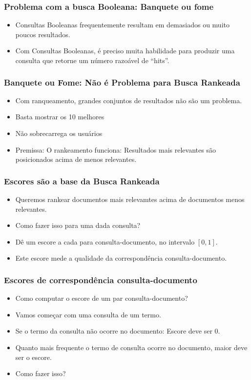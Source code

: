 \documentclass[compress]{beamer}
\def\myblue#1{\textcolor{texblue}{#1}}
\begin{document}
\begin{frame}[<+->]
\frametitle{Problema com a busca Booleana: Banquete ou fome}
\pause[2]
\begin{itemize}
\item Consultas Booleanas frequentemente resultam em demasiados ou muito poucos resultados.
\item Com Consultas Booleanas, é preciso muita habilidade para produzir uma consulta que retorne um número razoável de ``hits''.
\end{itemize}
\end{frame}

\begin{frame}[<+->]
\frametitle{Banquete ou Fome: Não é Problema para Busca Rankeada}
\pause[2]
\begin{itemize}
\item Com ranqueamento, grandes conjuntos de resultados não são um problema.
\item Basta mostrar os 10 melhores
\item Não sobrecarrega os usuários
\item Premissa: O rankeamento funciona: \myblue{Resultados mais relevantes são posicionados acima de menos relevantes.}
\end{itemize}
\end{frame}

\begin{frame}[<+->]
\frametitle{Escores são a base da Busca Rankeada}
\pause[2]
\begin{itemize}
\item Queremos rankear documentos mais relevamtes acima de documentos menos relevantes.
\item Como fazer isso para uma dada consulta?
\item Dê um escore a cada para consulta-documento, no intervalo $[0,1]$.
\item Este escore mede a qualidade da correspondência consulta-documento.
\end{itemize}
\end{frame}

\begin{frame}[<+->]
\frametitle{Escores de correspondência consulta-documento}
\begin{itemize}
\item Como computar o escore de um par consulta-documento?
\item Vamos começar com uma consulta de um termo.
\item Se o termo da consulta não ocorre no documento: Escore deve ser $0$.
\item Quanto mais frequente o termo de consulta ocorre no documento, maior deve ser o escore.
\item Como fazer isso?
\end{itemize}
\end{frame}
\end{document}
